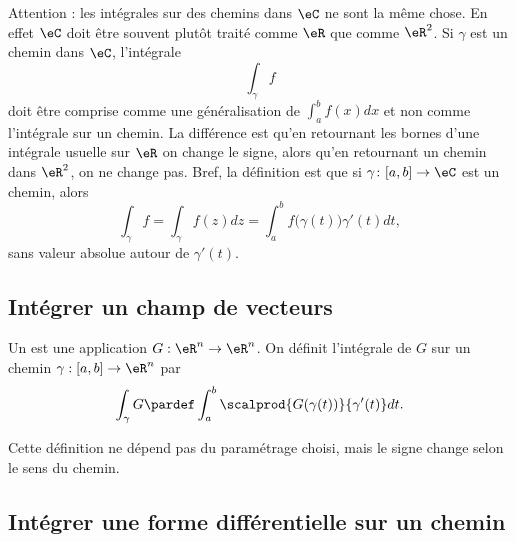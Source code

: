 \begin{remark}      \label{RemiqswPd}
	Attention : les intégrales sur des chemins dans \( \eC\) ne sont la même chose. En effet \( \eC\) doit être souvent plutôt traité comme \( \eR\) que comme \( \eR^2\). Si \( \gamma\) est un chemin dans \( \eC\), l'intégrale
	\begin{equation}
		\int_{\gamma}f
	\end{equation}
	doit être comprise comme une généralisation de \( \int_a^bf(x)dx\) et non comme l'intégrale sur un chemin. La différence est qu'en retournant les bornes d'une intégrale usuelle sur \( \eR\) on change le signe, alors qu'en retournant un chemin dans \( \eR^2\), on ne change pas. Bref, la définition est que si \( \gamma\colon \mathopen[ a , b \mathclose]\to \eC\) est un chemin, alors
	\begin{equation}
		\int_{\gamma}f=\int_{\gamma}f(z)dz=\int_a^bf\big( \gamma(t) \big)\gamma'(t)dt,
	\end{equation}
	sans valeur absolue autour de \( \gamma'(t)\).
\end{remark}

\subsection{Intégrer un champ de vecteurs}

\begin{definition}      \label{DEFooSHHFooVdsxMf}
	Un  est une application \( G : \eR^n \to \eR^n\). On définit l'intégrale de \( G\) sur un chemin \( \gamma : [a,b] \to \eR^n\) par
	\begin{equation*}
		\int_\gamma G \pardef \int_a^b \scalprod {G(\gamma(t))}{\gamma^\prime(t)} d t.
	\end{equation*}
\end{definition}

\begin{remark}
	Cette définition ne dépend pas du paramétrage choisi, mais le signe change selon le sens du chemin.
\end{remark}

\subsection{Intégrer une forme différentielle sur un chemin}

